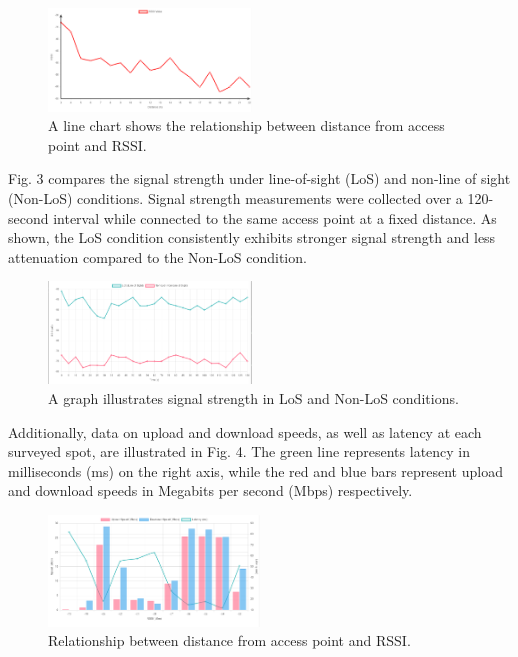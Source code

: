 \documentclass[conference]{IEEEtran}
\begin{document}
\begin{figure}[htbp]
    \centering
    \includegraphics[width=0.48\textwidth]{fig2_rssi.png}
    \caption{A line chart shows the relationship between distance from access
point and RSSI.}
\end{figure}

Fig. 3 compares the signal strength under line-of-sight (LoS) and non-line of sight (Non-LoS) conditions. Signal strength measurements were collected over a 120-second interval while connected to the same access point at a fixed distance. As shown, the LoS condition consistently exhibits stronger signal strength and less attenuation compared to the Non-LoS condition.

\begin{figure}[htbp]
    \centering
    \includegraphics[width=0.48\textwidth]{fig3_los_nonlos.png}
    \caption{A graph illustrates signal strength in LoS and Non-LoS conditions.}
    \label{fig:los_nonlos}
\end{figure}

Additionally, data on upload and download speeds, as well as latency at each surveyed spot, are illustrated in Fig. 4. The green line represents latency in milliseconds (ms) on the right axis, while the red and blue bars represent upload and download speeds in Megabits per second (Mbps) respectively.

\begin{figure}[htbp]
    \centering
    \includegraphics[width=0.5\textwidth]{fig4_speed_test.png}
    \caption{Relationship between distance from access point and RSSI.}
\end{figure}
\end{document}
